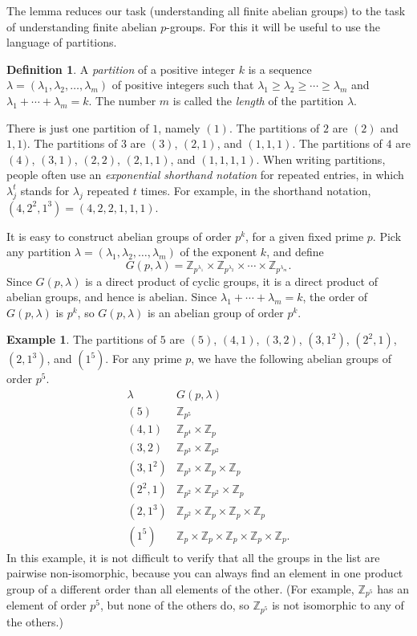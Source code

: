\documentclass[11pt,oneside]{article}
\theoremstyle{definition}
\newtheorem{defn}[thm]{Definition}
\newtheorem{example}[thm]{Example}
\newcommand{\Z}{\mathbb{Z}} %
\begin{document}
The lemma reduces our task (understanding all finite abelian groups)
to the task of understanding finite abelian $p$-groups. For this it
will be useful to use the language of partitions.

\begin{defn}
A \emph{partition} of a positive integer $k$ is a sequence $\lambda =
(\lambda_1, \lambda_2, \dots, \lambda_m)$ of positive integers such
that $\lambda_1 \ge \lambda_2 \ge \cdots \ge \lambda_m$ and $\lambda_1
+ \cdots + \lambda_m = k$. The number $m$ is called the \emph{length}
of the partition $\lambda$.
\end{defn}

There is just one partition of $1$, namely $(1)$. The partitions of
$2$ are $(2)$ and $1,1)$. The partitions of $3$ are $(3)$, $(2,1)$,
and $(1,1,1)$.  The partitions of $4$ are $(4)$, $(3,1)$, $(2,2)$,
$(2,1,1)$, and $(1,1,1,1)$. When writing partitions, people often use
an \emph{exponential shorthand notation} for repeated entries, in
which $\lambda_j^t$ stands for $\lambda_j$ repeated $t$ times. For
example, in the shorthand notation, $(4,2^2,1^3) = (4,2,2,1,1,1)$.

It is easy to construct abelian groups of order $p^k$, for a given
fixed prime $p$. Pick any partition $\lambda = (\lambda_1, \lambda_2,
\dots, \lambda_m)$ of the exponent $k$, and define
\[
  G(p,\lambda) = \Z_{p^{\lambda_1}} \times \Z_{p^{\lambda_2}} \times
  \cdots \times \Z_{p^{\lambda_m}}.
\]
Since $G(p,\lambda)$ is a direct product of cyclic groups, it is a
direct product of abelian groups, and hence is abelian. Since
$\lambda_1 + \cdots + \lambda_m = k$, the order of $G(p,\lambda)$ is
$p^k$, so $G(p,\lambda)$ is an abelian group of order $p^k$.


\begin{example}
The partitions of $5$ are $(5)$, $(4,1)$, $(3,2)$, $(3,1^2)$,
$(2^2,1)$, $(2,1^3)$, and $(1^5)$. For any prime $p$, we have the
following abelian groups of order $p^5$.
\[
\begin{array}{ll}
  \lambda & G(p,\lambda) \\ \hline
  (5) & \Z_{p^5} \\
  (4,1) & \Z_{p^4} \times \Z_{p} \\
  (3,2) & \Z_{p^3} \times \Z_{p^2} \\
  (3,1^2) & \Z_{p^3} \times \Z_{p} \times \Z_p \\
  (2^2,1) & \Z_{p^2} \times \Z_{p^2} \times \Z_p \\
  (2,1^3) & \Z_{p^2} \times \Z_{p} \times \Z_p \times \Z_p \\
  (1^5) & \Z_{p} \times \Z_p \times \Z_p\times \Z_p \times \Z_p .
\end{array}
\]
In this example, it is not difficult to verify that all the groups in
the list are pairwise non-isomorphic, because you can always find an
element in one product group of a different order than all elements of
the other. (For example, $\Z_{p^5}$ has an element of order $p^5$, but
none of the others do, so $\Z_{p^5}$ is not isomorphic to any of the
others.)
\end{example}
\end{document}
